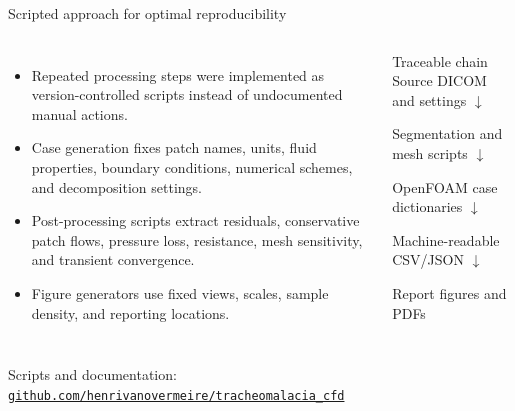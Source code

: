 \documentclass[aspectratio=169,11pt]{beamer}
\begin{document}
\begin{frame}{Scripted approach for optimal reproducibility}
  \begin{columns}[T,onlytextwidth]
      \begin{itemize}
        \item Repeated processing steps were implemented as version-controlled scripts instead of undocumented manual actions.
        \item Case generation fixes patch names, units, fluid properties, boundary conditions, numerical schemes, and decomposition settings.
        \item Post-processing scripts extract residuals, conservative patch flows, pressure loss, resistance, mesh sensitivity, and transient convergence.
        \item Figure generators use fixed views, scales, sample density, and reporting locations.
      \end{itemize}
      \begin{block}{Traceable chain}
        Source DICOM and settings
        $\downarrow$

        Segmentation and mesh scripts
        $\downarrow$

        OpenFOAM case dictionaries
        $\downarrow$

        Machine-readable CSV/JSON
        $\downarrow$

        Report figures and PDFs
      \end{block}
  \end{columns}
  \centering\scriptsize Scripts and documentation: \href{https://github.com/henrivanovermeire/tracheomalacia_cfd}{\texttt{github.com/henrivanovermeire/tracheomalacia\_cfd}}
\end{frame}
\end{document}
